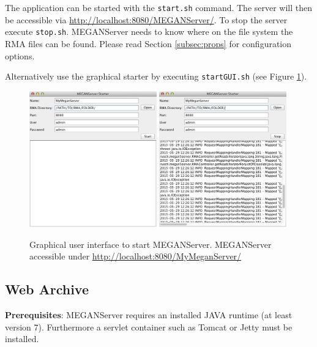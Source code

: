 \documentclass[11pt]{article}
\begin{document}
The application can be started with the \texttt{start.sh} command. The server will then be accessible via \url{http://localhost:8080/MEGANServer/}. To stop the server execute \texttt{stop.sh}. MEGANServer needs to know where on the file system the RMA files can be found. Please read Section \ref{subsec:props} for configuration options.


Alternatively use the graphical starter by executing \texttt{startGUI.sh} (see Figure \ref{fig:starter}).
\begin{figure}[h!]
  
  \centering
    \includegraphics[width=0.49\textwidth]{ServerStarter1.png}
    \includegraphics[width=0.49\textwidth]{ServerStarter2.png}
    \caption{Graphical user interface to start MEGANServer. MEGANServer accessible under \url{http://localhost:8080/MyMeganServer/}}
    \label{fig:starter}
\end{figure}


\subsection{Web Archive}
\textbf{Prerequisites}: MEGANServer requires an installed JAVA runtime (at least version 7). Furthermore a servlet container such as Tomcat or Jetty must be installed.
\end{document}
